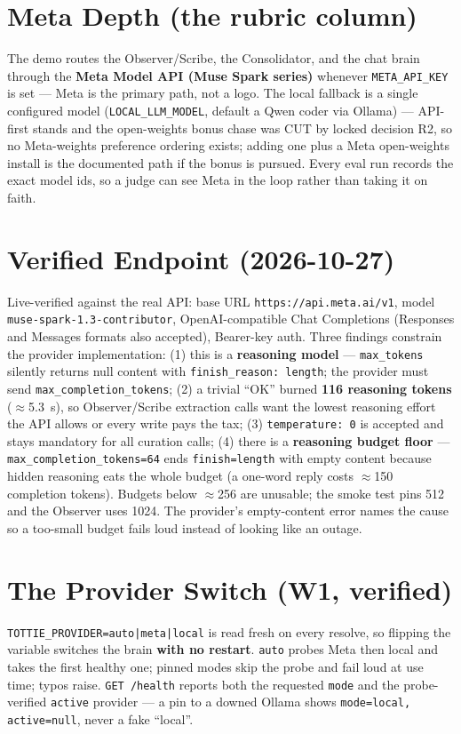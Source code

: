 \section{Meta Depth (the rubric column)}
The demo routes the Observer/Scribe, the Consolidator, and the chat brain through the
\textbf{Meta Model API (Muse Spark series)} whenever \texttt{META\_API\_KEY} is set --- Meta is
the primary path, not a logo. The local fallback is a single configured model
(\texttt{LOCAL\_LLM\_MODEL}, default a Qwen coder via Ollama) --- API-first stands and the
open-weights bonus chase was CUT by locked decision R2, so no Meta-weights preference ordering
exists; adding one plus a Meta open-weights install is the documented path if the bonus is
pursued. Every eval run records the exact model ids, so a judge can see Meta in the loop rather
than taking it on faith.

\section{Verified Endpoint (2026-10-27)}
Live-verified against the real API: base URL \texttt{https://api.meta.ai/v1}, model
\texttt{muse-spark-1.3-contributor}, OpenAI-compatible Chat Completions (Responses and Messages
formats also accepted), Bearer-key auth. Three findings constrain the provider implementation:
(1) this is a \textbf{reasoning model} --- \texttt{max\_tokens} silently returns null content
with \texttt{finish\_reason: length}; the provider must send \texttt{max\_completion\_tokens};
(2) a trivial ``OK'' burned \textbf{116 reasoning tokens} ($\approx$5.3~s), so Observer/Scribe
extraction calls want the lowest reasoning effort the API allows or every write pays the tax;
(3) \texttt{temperature: 0} is accepted and stays mandatory for all curation calls;
(4) there is a \textbf{reasoning budget floor} --- \texttt{max\_completion\_tokens=64} ends
\texttt{finish=length} with empty content because hidden reasoning eats the whole budget (a
one-word reply costs $\approx$150 completion tokens). Budgets below $\approx$256 are unusable;
the smoke test pins 512 and the Observer uses 1024. The provider's empty-content error names
the cause so a too-small budget fails loud instead of looking like an outage.

\section{The Provider Switch (W1, verified)}
\texttt{TOTTIE\_PROVIDER=auto|meta|local} is read fresh on every resolve, so flipping the
variable switches the brain \textbf{with no restart}. \texttt{auto} probes Meta then local and
takes the first healthy one; pinned modes skip the probe and fail loud at use time; typos raise.
\texttt{GET /health} reports both the requested \texttt{mode} and the probe-verified
\texttt{active} provider --- a pin to a downed Ollama shows \texttt{mode=local, active=null},
never a fake ``local''.

